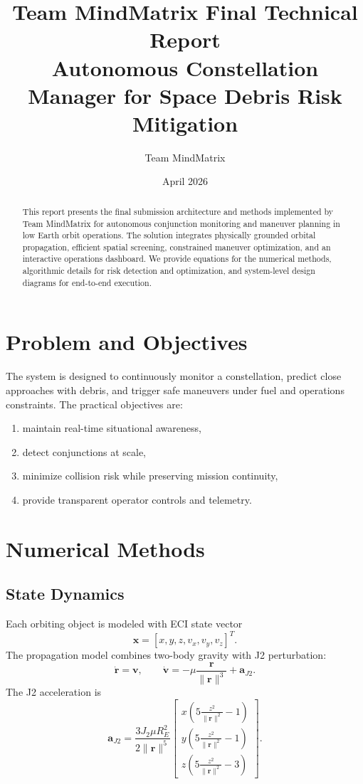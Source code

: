 \documentclass[11pt,a4paper]{article}
\title{\textbf{Team MindMatrix Final Technical Report}\\
\large Autonomous Constellation Manager for Space Debris Risk Mitigation}
\author{Team MindMatrix}
\date{April 2026}
\begin{document}
\maketitle

\begin{abstract}
This report presents the final submission architecture and methods implemented by Team MindMatrix for autonomous conjunction monitoring and maneuver planning in low Earth orbit operations. The solution integrates physically grounded orbital propagation, efficient spatial screening, constrained maneuver optimization, and an interactive operations dashboard. We provide equations for the numerical methods, algorithmic details for risk detection and optimization, and system-level design diagrams for end-to-end execution.
\end{abstract}

\section{Problem and Objectives}
The system is designed to continuously monitor a constellation, predict close approaches with debris, and trigger safe maneuvers under fuel and operations constraints. The practical objectives are:
\begin{enumerate}
  \item maintain real-time situational awareness,
  \item detect conjunctions at scale,
  \item minimize collision risk while preserving mission continuity,
  \item provide transparent operator controls and telemetry.
\end{enumerate}

\section{Numerical Methods}
\subsection{State Dynamics}
Each orbiting object is modeled with ECI state vector
\[
\mathbf{x} = [x,y,z,v_x,v_y,v_z]^T.
\]
The propagation model combines two-body gravity with J2 perturbation:
\[
\dot{\mathbf{r}} = \mathbf{v}, \qquad
\dot{\mathbf{v}} = -\mu\frac{\mathbf{r}}{\|\mathbf{r}\|^3} + \mathbf{a}_{J2}.
\]
The J2 acceleration is
\[
\mathbf{a}_{J2}=\frac{3J_2\mu R_E^2}{2\|\mathbf{r}\|^5}
\begin{bmatrix}
x\left(5\frac{z^2}{\|\mathbf{r}\|^2}-1\right)\\
y\left(5\frac{z^2}{\|\mathbf{r}\|^2}-1\right)\\
z\left(5\frac{z^2}{\|\mathbf{r}\|^2}-3\right)
\end{bmatrix}.
\]
\end{document}
